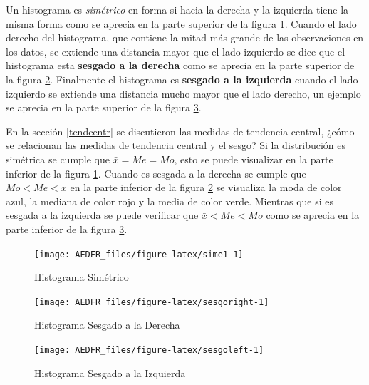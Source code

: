 \documentclass[letterpaper,]{book}
\begin{document}
Un histograma es \emph{simétrico} en forma si hacia la derecha y la izquierda tiene la misma forma como se aprecia en la parte superior de la figura \ref{fig:sime1}. Cuando el lado derecho del histograma, que contiene la mitad más grande de las observaciones en los datos, se extiende una distancia mayor que el lado izquierdo se dice que el histograma esta \textbf{sesgado a la derecha} como se aprecia en la parte superior de la figura \ref{fig:sesgoright}. Finalmente el histograma es \textbf{sesgado a la izquierda} cuando el lado izquierdo se extiende una distancia mucho mayor que el lado derecho, un ejemplo se aprecia en la parte superior de la figura \ref{fig:sesgoleft}.

En la sección \ref{tendcentr} se discutieron las medidas de tendencia central, ¿cómo se relacionan las medidas de tendencia central y el sesgo? Si la distribución es simétrica se cumple que \(\bar{x}=Me=Mo\), esto se puede visualizar en la parte inferior de la figura \ref{fig:sime1}. Cuando es sesgada a la derecha se cumple que \(Mo < Me < \bar{x}\) en la parte inferior de la figura \ref{fig:sesgoright} se visualiza la moda de color azul, la mediana de color rojo y la media de color verde. Mientras que si es sesgada a la izquierda se puede verificar que \(\bar{x} < Me < Mo\) como se aprecia en la parte inferior de la figura \ref{fig:sesgoleft}.

\begin{figure}[h!]

{\centering \texttt{[image: AEDFR\_files/figure-latex/sime1-1]} 

}

\caption{Histograma Simétrico}\label{fig:sime1}
\end{figure}

\begin{figure}[h!]

{\centering \texttt{[image: AEDFR\_files/figure-latex/sesgoright-1]} 

}

\caption{Histograma Sesgado a la Derecha}\label{fig:sesgoright}
\end{figure}

\begin{figure}[h!]

{\centering \texttt{[image: AEDFR\_files/figure-latex/sesgoleft-1]} 

}

\caption{Histograma Sesgado a la Izquierda}\label{fig:sesgoleft}
\end{figure}
\end{document}
